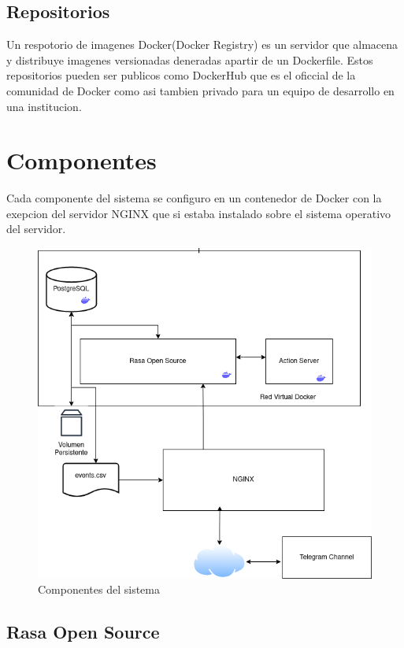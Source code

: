 \subsection{Repositorios}
Un respotorio de imagenes Docker(Docker Registry) es un servidor que almacena y distribuye imagenes versionadas deneradas apartir de un Dockerfile. Estos repositorios pueden ser publicos como DockerHub que es el oficcial de la comunidad de Docker como asi tambien privado para un equipo de desarrollo en una institucion.
\cite{Docker}

\section{Componentes}

Cada componente del sistema se configuro en un contenedor de Docker con la exepcion del servidor NGINX que si estaba instalado sobre el sistema operativo del servidor. 
\begin{figure}[ht]
    \centering
    \includegraphics[width=\textwidth]{imagenes/cap4/server.png}
    \caption{Componentes del sistema}
    \label{fig:server_diagram}
\end{figure}


\subsection{Rasa Open Source}

